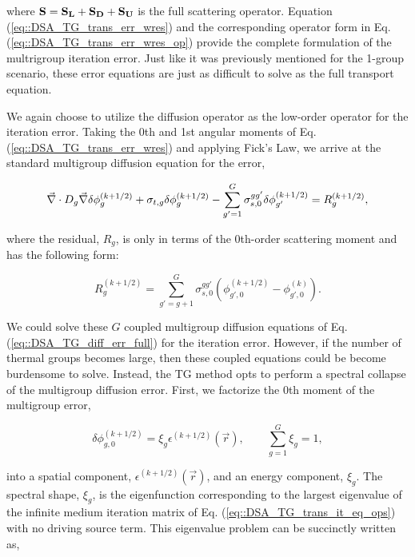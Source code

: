 \noindent where ${\bf S} = {\bf S_L} + {\bf S_D} +{\bf S_U} $ is the full scattering operator. Equation (\ref{eq::DSA_TG_trans_err_wres}) and the corresponding operator form in Eq. (\ref{eq::DSA_TG_trans_err_wres_op}) provide the complete formulation of the multrigroup iteration error. Just like it was previously mentioned for the 1-group scenario, these error equations are just as difficult to solve as the full transport equation. 

We again choose to utilize the diffusion operator as the low-order operator for the iteration error. Taking the 0th and 1st angular moments of Eq. (\ref{eq::DSA_TG_trans_err_wres}) and applying Fick's Law, we arrive at the standard multigroup diffusion equation for the error,

\begin{equation}
\label{eq::DSA_TG_diff_err_full}
\vec{\nabla} \cdot D_g \vec{\nabla} \delta \phi_{g}^{(k+1/2)} + \sigma_{t,g} \delta \phi_{g}^{(k+1/2)} - \sum\displaylimits_{g'=1}^{G} \sigma_{s,0}^{g g'} \delta \phi_{g'}^{(k+1/2)} = R_g^{(k+1/2)} ,
\end{equation}

\noindent where the residual, $R_g$, is only in terms of the 0th-order scattering moment and has the following form:

\begin{equation}
\label{eq::DSA_TG_diff_residual}
R_g^{(k+1/2)} = \sum_{g'=g+1}^G \sigma_{s,0}^{g g'} \left( \phi_{g',0}^{(k+1/2)} - \phi_{g',0}^{(k)} \right) .
\end{equation}

\noindent We could solve these $G$ coupled multigroup diffusion equations of Eq. (\ref{eq::DSA_TG_diff_err_full}) for the iteration error. However, if the number of thermal groups becomes large, then these coupled equations could be become burdensome to solve. Instead, the TG method opts to perform a spectral collapse of the multigroup diffusion error. First, we factorize the 0th moment of the multigroup error,

\begin{equation}
\label{eq::DSA_TG_fact_err}
\delta \phi_{g,0}^{(k+1/2)} = \xi_g \epsilon^{(k+1/2)} (\vec{r}), \qquad \sum_{g=1}^G \xi_g = 1,
\end{equation}

\noindent into a spatial component, $\epsilon^{(k+1/2)} (\vec{r})$, and an energy component, $\xi_g$. The spectral shape, $\xi_g$, is the eigenfunction corresponding to the largest eigenvalue of the infinite medium iteration matrix of Eq. (\ref{eq::DSA_TG_trans_it_eq_ops}) with no driving source term. This eigenvalue problem can be succinctly written as,

